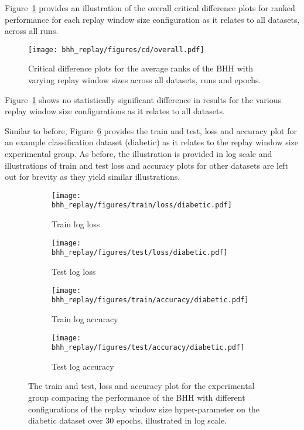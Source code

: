 Figure~\ref{fig:results:replay:descriptive:cd} provides an illustration of the overall critical difference plots for ranked performance for each replay window size configuration as it relates to all datasets, across all runs.

\begin{figure}[H]
	\centering
	\texttt{[image: bhh\_replay/figures/cd/overall.pdf]}
	\caption{Critical difference plots for the average ranks of the \acs{BHH} with varying replay window sizes across all datasets, runs and epochs.}
	\label{fig:results:replay:descriptive:cd}
\end{figure}

Figure~\ref{fig:results:replay:descriptive:cd} shows no statistically significant difference in results for the various replay window size configurations as it relates to all datasets.

Similar to before, Figure~\ref{fig:results:replay:figures:diabetic} provides the train and test, loss and accuracy plot for an example classification dataset (diabetic) as it relates to the replay window size experimental group. As before, the illustration is provided in log scale and illustrations of train and test loss and accuracy plots for other datasets are left out for brevity as they yield similar illustrations.

\begin{figure}[H]
	\begin{subfigure}{0.5\textwidth}
		\centering
		\texttt{[image: bhh\_replay/figures/train/loss/diabetic.pdf]}
		\caption{Train log loss}
		\label{fig:results:replay:figures:loss:train:diabetic}
	\end{subfigure}
	\begin{subfigure}{0.5\textwidth}
		\centering
		\texttt{[image: bhh\_replay/figures/test/loss/diabetic.pdf]}
		\caption{Test log loss}
		\label{fig:results:replay:figures:loss:test:diabetic}
	\end{subfigure}
	\par\bigskip
	\begin{subfigure}{0.5\textwidth}
		\centering
		\texttt{[image: bhh\_replay/figures/train/accuracy/diabetic.pdf]}
		\caption{Train log accuracy}
		\label{fig:results:replay:figures:accuracy:train:diabetic}
	\end{subfigure}
	\begin{subfigure}{0.5\textwidth}
		\centering
		\texttt{[image: bhh\_replay/figures/test/accuracy/diabetic.pdf]}
		\caption{Test log accuracy}
		\label{fig:results:replay:figures:accuracy:test:diabetic}
	\end{subfigure}
	\par\bigskip
	\caption{The train and test, loss and accuracy plot for the experimental group comparing the performance of the \acs{BHH} with different configurations of the replay window size hyper-parameter on the diabetic dataset over 30 epochs, illustrated in log scale.}
	\label{fig:results:replay:figures:diabetic}
\end{figure}

